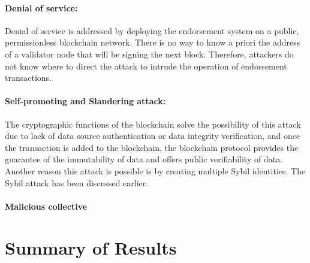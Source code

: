 \paragraph{Denial of service:} Denial of service is addressed by deploying the
endorsement system on a public, permissionless blockchain network. There is no
way to know a priori the address of a validator node that will be signing the
next block. Therefore, attackers do not know where to direct the attack to
intrude the operation of endorsement transactions. 
\paragraph{Self-promoting and Slandering attack:}The cryptographic functions of
the blockchain solve the possibility of this attack due to lack of data source
authentication or data integrity verification, and once the transaction is
added to the blockchain, the blockchain protocol provides the guarantee of the
immutability of data and offers public verifiability of data. Another reason
this attack is possible is by creating multiple Sybil identities. The Sybil
attack has been discussed earlier. 
\paragraph{Malicious collective}


\section{Summary of Results}

%





